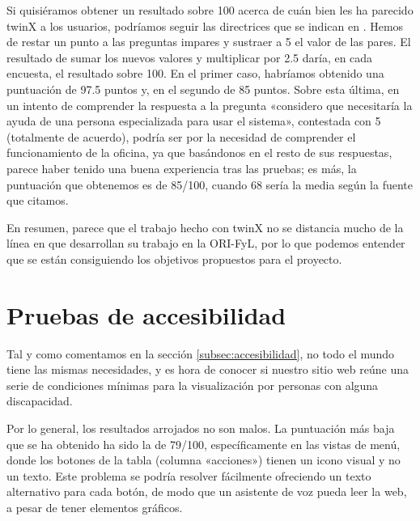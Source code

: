 Si quisiéramos obtener un resultado sobre 100 acerca de cuán bien les ha parecido twinX a los usuarios, podríamos seguir las directrices que se indican en \cite{susscore}. Hemos de restar un punto a las preguntas impares y sustraer a 5 el valor de las pares. El resultado de sumar los nuevos valores y multiplicar por 2.5 daría, en cada encuesta, el resultado sobre 100. En el primer caso, habríamos obtenido una puntuación de 97.5 puntos y, en el segundo de 85 puntos. Sobre esta última, en un intento de comprender la respuesta a la pregunta «considero que necesitaría la ayuda de una persona especializada para usar el sistema», contestada con 5 (totalmente de acuerdo), podría ser por la necesidad de comprender el funcionamiento de la oficina, ya que basándonos en el resto de sus respuestas, parece haber tenido una buena experiencia tras las pruebas; es más, la puntuación que obtenemos es de 85/100, cuando 68 sería la media según la fuente que citamos.

En resumen, parece que el trabajo hecho con twinX no se distancia mucho de la línea en que desarrollan su trabajo en la ORI-FyL, por lo que podemos entender que se están consiguiendo los objetivos propuestos para el proyecto.

\section{Pruebas de accesibilidad}

Tal y como comentamos en la sección \ref{subsec:accesibilidad}, no todo el mundo tiene las mismas necesidades, y es hora de conocer si nuestro sitio web reúne una serie de condiciones mínimas para la visualización por personas con alguna discapacidad.

Por lo general, los resultados arrojados no son malos. La puntuación más baja que se ha obtenido ha sido la de 79/100, específicamente en las vistas de menú, donde los botones de la tabla (columna «acciones») tienen un icono visual y no un texto. Este problema se podría resolver fácilmente ofreciendo un texto alternativo para cada botón, de modo que un asistente de voz pueda leer la web, a pesar de tener elementos gráficos.


